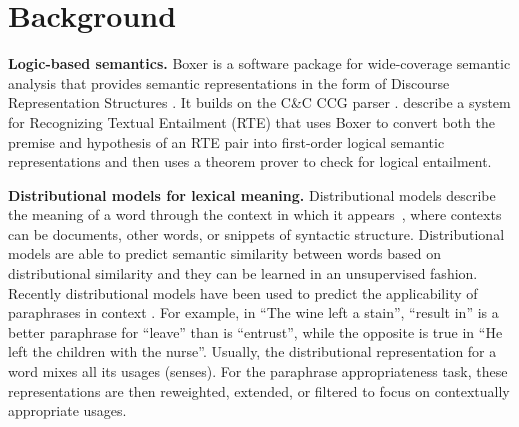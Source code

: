 \section{Background}

\textbf{Logic-based semantics.}
Boxer \citep{bos:coling2004} is a software package for wide-coverage semantic
analysis that provides semantic representations in the form of Discourse
Representation Structures \citep{kamp:book93}. It builds on the C\&C CCG parser
\citep{clark:acl04}.
\citet{bos:emnlp2005} describe a system for Recognizing Textual Entailment
(RTE) that uses Boxer to convert both the premise and hypothesis of an RTE pair
into first-order logical semantic representations and then uses a theorem prover
to check for logical entailment. 


\noindent\textbf{Distributional models for lexical meaning.}
Distributional models describe the meaning of a word through the context in
which it appears~\citep{landauer97:solution,lund96:producing}, where contexts 
can be documents, other words, or snippets
of syntactic structure. Distributional models are able to predict semantic
similarity between words based on distributional similarity and they can be
learned in an unsupervised fashion. Recently distributional models have been
used to predict the applicability of paraphrases in context
\citep{MitchellLapata:08,erk:emnlp08,ThaterFuerstenauPinkal:10,erk:acl2010}. 
For example,
in ``The wine left a stain'', ``result in'' is a better paraphrase for
``leave'' than is ``entrust'', while the opposite is true in
``He left the children with the nurse''. Usually, the distributional
representation for a word mixes all its usages (senses). For the paraphrase
appropriateness task, these representations are then reweighted, extended, or
filtered to focus on contextually appropriate usages.

